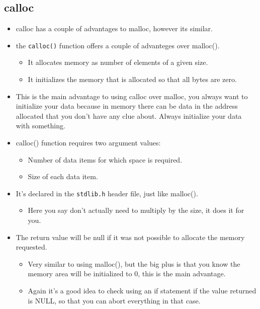 \subsection{calloc}
\begin{itemize}
    \item calloc has a couple of advantages to malloc, however its similar. 
    \item the \texttt{calloc()} function offers a couple of advanteges over malloc().
        \begin{itemize}
            \item It allocates memory as number of elements of a given size. 
            \item It initializes the memory that is allocated so that all bytes are zero. 
        \end{itemize}
    
    \item This is the main advantage to using calloc over malloc, you always want to initialize your data because in memory there can be data in the address allocated that you don't have any clue about. Always initialize your data with something.
    \item calloc() function requires two argument values:
        \begin{itemize}
            \item Number of data items for which space is required. 
            \item Size of each data item. 
        \end{itemize}
    
    \item It's declared in the \texttt{stdlib.h} header file, just like malloc().
        \begin{itemize}
            \item Here you say don't actually need to multiply by the size, it does it for you. 
        \end{itemize}
    
    \item The return value will be null if it was not possible to allocate the memory requested.
        \begin{itemize}
            \item Very similar to using malloc(), but the big plus is that you know the memory area will be initialized to 0, this is the main advantage. 
            \item Again it's a good idea to check using an if statement if the value returned is NULL, so that you can abort everything in that case. 
        \end{itemize}
\end{itemize}

